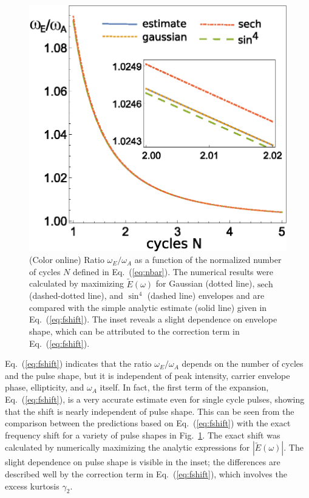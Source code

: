 \begin{figure}[t]
\centering
    \includegraphics[width=0.8\linewidth]{figs/Frequency_shift/fshift51.eps}
\caption{(Color online)
Ratio $\omega_E/\omega_A$ as a function of the normalized number of cycles $ N$ defined in Eq.~(\ref{eq:nbar}). The numerical results were calculated by maximizing $\tilde{E}(\omega)$ for Gaussian (dotted line), $\text{sech}$ (dashed-dotted line), and $\sin^4$ (dashed line) envelopes and are compared with the simple analytic estimate (solid line) given in Eq.~(\ref{eq:fshift}). The inset reveals a slight dependence on envelope shape, which can be attributed to the correction term in Eq.~(\ref{eq:fshift}).
}
  \label{fig:shift}
\end{figure}

Eq.~(\ref{eq:fshift}) indicates that the ratio $\omega_E/\omega_A$ depends on the number of cycles and the pulse shape, but it is independent of peak intensity, carrier envelope phase, ellipticity, and $\omega_A$ itself. In fact, the first term of the expansion, Eq.~(\ref{eq:fshift}), is a very accurate estimate even for single cycle pulses, showing that the shift is nearly independent of pulse shape. This can be seen from the comparison between the predictions based on Eq.~(\ref{eq:fshift}) with the exact frequency shift for a variety of pulse shapes in Fig.~\ref{fig:shift}. The exact shift was calculated by numerically maximizing the analytic expressions for $|\tilde{E}(\omega)|$. The slight dependence on pulse shape is visible in the inset; the differences are described well by the correction term in Eq.~(\ref{eq:fshift}), which involves the excess kurtosis $\gamma_2$.

